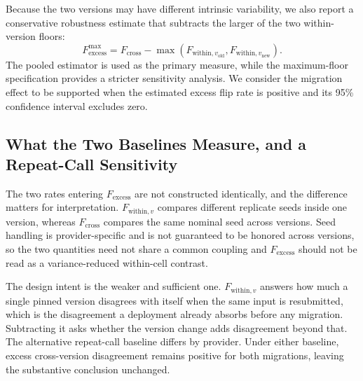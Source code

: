 \documentclass{ieeeaccess}
\begin{document}
Because the two versions may have different intrinsic variability, we also report a conservative robustness estimate that subtracts the larger of the two within-version floors:
\begin{equation}
F_{\mathrm{excess}}^{\mathrm{max}} = F_{\mathrm{cross}} - \max\!\left( F_{\mathrm{within},v_{\mathrm{old}}}, F_{\mathrm{within},v_{\mathrm{new}}} \right).
\end{equation}
The pooled estimator is used as the primary measure, while the maximum-floor specification provides a stricter sensitivity analysis. We consider the migration effect to be supported when the estimated excess flip rate is positive and its 95\% confidence interval excludes zero.



\subsection{What the Two Baselines Measure, and a Repeat-Call Sensitivity}
\label{subsec:estimand}
The two rates entering $F_{\mathrm{excess}}$ are not constructed identically, and the difference
matters for interpretation. $F_{\mathrm{within},v}$ compares different replicate seeds inside one
version, whereas $F_{\mathrm{cross}}$ compares the same nominal seed across versions. Seed handling
is provider-specific and is not guaranteed to be honored across versions, so the two quantities need
not share a common coupling and $F_{\mathrm{excess}}$ should not be read as a variance-reduced
within-cell contrast.

The design intent is the weaker and sufficient one. $F_{\mathrm{within},v}$ answers how much a
single pinned version disagrees with itself when the same input is resubmitted, which is the
disagreement a deployment already absorbs before any migration. Subtracting it asks whether the
version change adds disagreement beyond that. The alternative repeat-call baseline differs by
provider. Under either baseline, excess cross-version disagreement remains positive for both
migrations, leaving the substantive conclusion unchanged.
\end{document}
